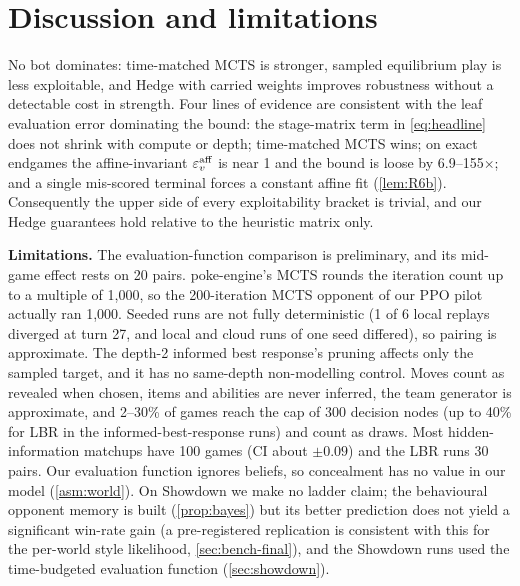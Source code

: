 \documentclass[10pt]{article}
\theoremstyle{plain}
\theoremstyle{definition}
\theoremstyle{remark}
\newcommand{\epsv}{\varepsilon_v}
\begin{document}
\section{Discussion and limitations}
\label{sec:discussion}
No bot dominates: time-matched MCTS is stronger, sampled equilibrium play is less exploitable, and Hedge with carried weights improves robustness without a detectable cost in strength. Four lines of evidence are consistent with the leaf evaluation error dominating the bound: the stage-matrix term in \eqref{eq:headline} does not shrink with compute or depth; time-matched MCTS wins; on exact endgames the affine-invariant $\epsv^{\rm aff}$ is near 1 and the bound is loose by 6.9--155$\times$; and a single mis-scored terminal forces a constant affine fit (\cref{lem:R6b}). Consequently the upper side of every exploitability bracket is trivial, and our Hedge guarantees hold relative to the heuristic matrix only.

\textbf{Limitations.} The evaluation-function comparison is preliminary, and its mid-game effect rests on 20 pairs. poke-engine's MCTS rounds the iteration count up to a multiple of 1,000, so the 200-iteration MCTS opponent of our PPO pilot actually ran 1,000. Seeded runs are not fully deterministic (1 of 6 local replays diverged at turn 27, and local and cloud runs of one seed differed), so pairing is approximate. The depth-2 informed best response's pruning affects only the sampled target, and it has no same-depth non-modelling control. Moves count as revealed when chosen, items and abilities are never inferred, the team generator is approximate, and 2--30\% of games reach the cap of 300 decision nodes (up to 40\% for LBR in the informed-best-response runs) and count as draws. Most hidden-information matchups have 100 games (CI about $\pm0.09$) and the LBR runs 30 pairs. Our evaluation function ignores beliefs, so concealment has no value in our model (\cref{asm:world}). On Showdown we make no ladder claim; the behavioural opponent memory is built (\cref{prop:bayes}) but its better prediction does not yield a significant win-rate gain (a pre-registered replication is consistent with this for the per-world style likelihood, \cref{sec:bench-final}), and the Showdown runs used the time-budgeted evaluation function (\cref{sec:showdown}).

\end{document}
